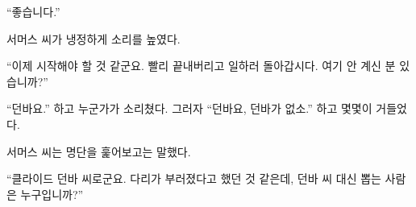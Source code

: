 \documentclass{translation}
\begin{document}
``좋습니다.''\par
서머스 씨가 냉정하게 소리를 높였다.\par
``이제 시작해야 할 것 같군요. 빨리 끝내버리고 일하러 돌아갑시다. 여기 안 계신 분 있습니까?''
% 

``던바요.'' 하고 누군가가 소리쳤다.
그러자 ``던바요, 던바가 없소.'' 하고 몇몇이 거들었다.
% 

서머스 씨는 명단을 훑어보고는 말했다.\par
``클라이드 던바 씨로군요. 다리가 부러졌다고 했던 것 같은데, 던바 씨 대신 뽑는 사람은 누구입니까?''
\end{document}
